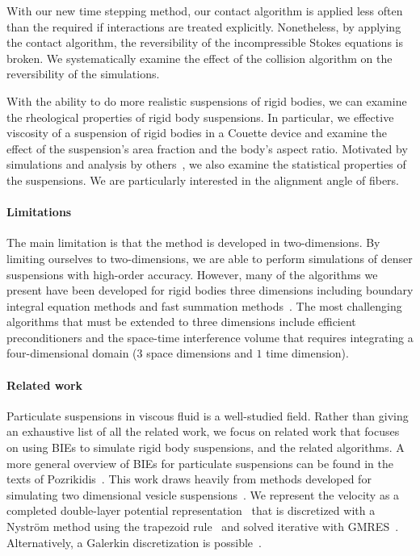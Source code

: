 \documentclass[preprint, 10pt]{elsarticle}
\begin{document}
With our new time stepping method, our contact algorithm is applied less
often than the required if interactions are treated explicitly.
Nonetheless, by applying the contact algorithm, the reversibility of the
incompressible Stokes equations is broken.  We systematically examine
the effect of the collision algorithm on the reversibility of the
simulations.

With the ability to do more realistic suspensions of rigid bodies, we
can examine the rheological properties of rigid body suspensions.  In
particular, we effective viscosity of a suspension of rigid bodies in a
Couette device and examine the effect of the suspension's area fraction
and the body's aspect ratio.  Motivated by simulations and analysis by
others~\cite{}, we also examine the statistical properties of the
suspensions.  We are particularly interested in the alignment angle of
fibers.

\paragraph{Limitations} The main limitation is that the method is
developed in two-dimensions.  By limiting ourselves to two-dimensions,
we are able to perform simulations of denser suspensions with high-order
accuracy.  However, many of the algorithms we present have been
developed for rigid bodies three dimensions including boundary integral
equation methods and fast summation methods~\cite{cor-gre-rac-vee2017,
kli-tor2014, kli-tor2016}.  The most challenging algorithms that must be
extended to three dimensions include efficient preconditioners and the
space-time interference volume that requires integrating a
four-dimensional domain ($3$ space dimensions and $1$ time dimension).


\paragraph{Related work} Particulate suspensions in viscous fluid is a
well-studied field.  Rather than giving an exhaustive list of all the
related work, we focus on related work that focuses on using BIEs to
simulate rigid body suspensions, and the related algorithms.  A more
general overview of BIEs for particulate suspensions can be found in the
texts of Pozrikidis~\cite{Pozrikidis1992, Guazzelli2011, Karrila1991}.
This work draws heavily from methods developed for simulating two
dimensional vesicle suspensions~\cite{Quaife2014, Quaife2015,
qua-bir2016, Rahimian2010, Lu2017}.  We represent the velocity as a
completed double-layer potential representation~\cite{Power1987,
Power1993, Karrila1989} that is discretized with a Nystr\"om method
using the trapezoid rule~\cite{Trefethen2014} and solved iterative with
GMRES~\cite{Saad1986}.  Alternatively, a Galerkin discretization is
possible~\cite{Mammoli1999, Mammoli2002, Mammoli2006}.
\end{document}

